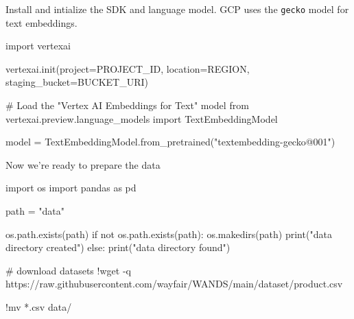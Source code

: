 \documentclass[
  letterpaper,
  DIV=11,
  numbers=noendperiod]{scrreprt}
\newenvironment{Shaded}{\begin{snugshade}}{\end{snugshade}}
\newcommand{\BuiltInTok}[1]{\textcolor[rgb]{0.00,0.23,0.31}{#1}}
\newcommand{\CommentTok}[1]{\textcolor[rgb]{0.37,0.37,0.37}{#1}}
\newcommand{\ControlFlowTok}[1]{\textcolor[rgb]{0.00,0.23,0.31}{#1}}
\newcommand{\ImportTok}[1]{\textcolor[rgb]{0.00,0.46,0.62}{#1}}
\newcommand{\KeywordTok}[1]{\textcolor[rgb]{0.00,0.23,0.31}{#1}}
\newcommand{\NormalTok}[1]{\textcolor[rgb]{0.00,0.23,0.31}{#1}}
\newcommand{\OperatorTok}[1]{\textcolor[rgb]{0.37,0.37,0.37}{#1}}
\newcommand{\StringTok}[1]{\textcolor[rgb]{0.13,0.47,0.30}{#1}}
\begin{document}
Install and intialize the SDK and language model. GCP uses the
\texttt{gecko} model for text embeddings.

\begin{Shaded}
\begin{Highlighting}[]
\ImportTok{import}\NormalTok{ vertexai}

\NormalTok{vertexai.init(project}\OperatorTok{=}\NormalTok{PROJECT\_ID, location}\OperatorTok{=}\NormalTok{REGION, staging\_bucket}\OperatorTok{=}\NormalTok{BUCKET\_URI)}
\end{Highlighting}
\end{Shaded}

\begin{Shaded}
\begin{Highlighting}[]
\CommentTok{\# Load the "Vertex AI Embeddings for Text" model}
\ImportTok{from}\NormalTok{ vertexai.preview.language\_models }\ImportTok{import}\NormalTok{ TextEmbeddingModel}

\NormalTok{model }\OperatorTok{=}\NormalTok{ TextEmbeddingModel.from\_pretrained(}\StringTok{"textembedding{-}gecko@001"}\NormalTok{)}
\end{Highlighting}
\end{Shaded}

Now we're ready to prepare the data

\begin{Shaded}
\begin{Highlighting}[]
\ImportTok{import}\NormalTok{ os}
\ImportTok{import}\NormalTok{ pandas }\ImportTok{as}\NormalTok{ pd}

\NormalTok{path }\OperatorTok{=} \StringTok{"data"}

\NormalTok{os.path.exists(path)}
\ControlFlowTok{if} \KeywordTok{not}\NormalTok{ os.path.exists(path):}
\NormalTok{  os.makedirs(path)}
  \BuiltInTok{print}\NormalTok{(}\StringTok{"data directory created"}\NormalTok{)}
\ControlFlowTok{else}\NormalTok{:}
  \BuiltInTok{print}\NormalTok{(}\StringTok{"data directory found"}\NormalTok{)}
\end{Highlighting}
\end{Shaded}

\begin{Shaded}
\begin{Highlighting}[]
\CommentTok{\# download datasets}
\OperatorTok{!}\NormalTok{wget }\OperatorTok{{-}}\NormalTok{q https:}\OperatorTok{//}\NormalTok{raw.githubusercontent.com}\OperatorTok{/}\NormalTok{wayfair}\OperatorTok{/}\NormalTok{WANDS}\OperatorTok{/}\NormalTok{main}\OperatorTok{/}\NormalTok{dataset}\OperatorTok{/}\NormalTok{product.csv}

\OperatorTok{!}\NormalTok{mv }\OperatorTok{*}\NormalTok{.csv data}\OperatorTok{/}
\end{Highlighting}
\end{Shaded}
\end{document}
